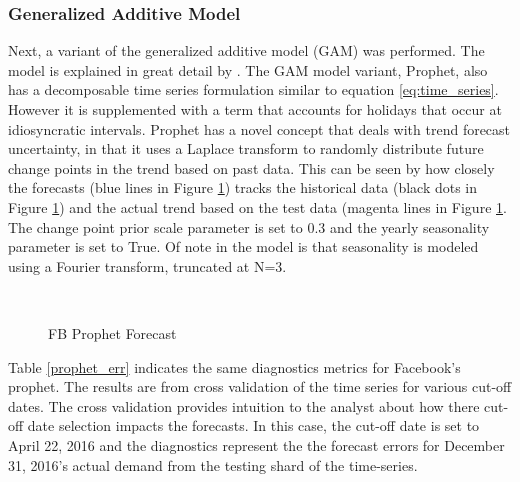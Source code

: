 \documentclass[conference]{IEEEtran}
\begin{document}
\subsubsection*{Generalized Additive Model}
Next, a variant of the generalized additive model (GAM) was performed. The model is explained in great detail by \cite{prophet}. The GAM model variant, Prophet, also has a decomposable time series formulation similar to equation \ref{eq:time_series}. However it is supplemented with a term that accounts for holidays that occur at idiosyncratic  intervals. Prophet has a novel concept that deals with trend forecast uncertainty, in that it uses a Laplace transform to randomly distribute future change points in the trend based on past data. This can be seen by how closely the forecasts (blue lines in Figure \ref{prophet_plots}) tracks the historical data (black dots in Figure \ref{prophet_plots}) and the actual trend based on the test data (magenta lines in Figure \ref{prophet_plots}. The change point prior scale parameter is set to 0.3 and the yearly seasonality parameter is set to True. Of note in the model is that seasonality is modeled using a Fourier transform, truncated at N=3.

\begin{figure}[!tbh]
   \\
  \caption{FB Prophet Forecast}
  \label{prophet_plots}
\end{figure}


Table \ref{prophet_err} indicates the same diagnostics metrics for Facebook's prophet. The results are from cross validation of the time series for various cut-off dates. The cross validation provides intuition to the analyst about how there cut-off date selection impacts the forecasts. In this case, the cut-off date is set to April 22, 2016 and the diagnostics represent the the forecast errors for December 31, 2016's actual demand from the testing shard of the time-series.
\end{document}
